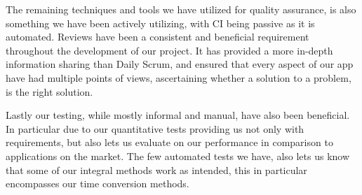 The remaining techniques and tools we have utilized for quality assurance, is also something we have been actively utilizing, with \ac{CI} being passive as it is automated.
Reviews have been a consistent and beneficial requirement throughout the development of our project.
It has provided a more in-depth information sharing than Daily Scrum, and ensured that every aspect of our app have had multiple points of views, ascertaining whether a solution to a problem, is the right solution.

Lastly our testing, while mostly informal and manual, have also been beneficial.
In particular due to our quantitative tests providing us not only with requirements, but also lets us evaluate on our performance in comparison to applications on the market.
The few automated tests we have, also lets us know that some of our integral methods work as intended, this in particular encompasses our time conversion methods.
